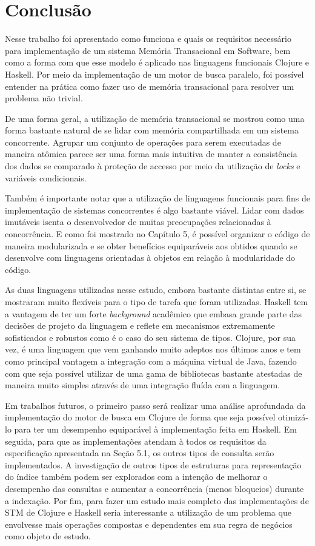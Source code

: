 \chapter{Conclusão}

Nesse trabalho foi apresentado como funciona e quais os requisitos necessário para implementação de um sistema Memória Transacional em Software, bem como a forma com que esse modelo é aplicado nas linguagens funcionais Clojure e Haskell. Por meio da implementação de um motor de busca paralelo, foi possível entender na prática como fazer uso de memória transacional para resolver um problema não trivial.

De uma forma geral, a utilização de memória transacional se mostrou como uma forma bastante natural de se lidar com memória compartilhada em um sistema concorrente. Agrupar um conjunto de operações para serem executadas de maneira atômica parece ser uma forma mais intuitiva de manter a consistência dos dados se comparado à proteção de accesso por meio da utilização de \emph{locks} e variáveis condicionais.

Também é importante notar que a utilização de linguagens funcionais para fins de implementação de sistemas concorrentes é algo bastante viável. Lidar com dados imutáveis isenta o desenvolvedor de muitas preocupações relacionadas à concorrência. E como foi mostrado no Capítulo 5, é possível organizar o código de maneira modularizada e se obter benefícios equiparáveis aos obtidos quando se desenvolve com linguagens orientadas à objetos em relação à modularidade do código.

As duas linguagens utilizadas nesse estudo, embora bastante distintas entre si, se mostraram muito flexíveis para o tipo de tarefa que foram utilizadas. Haskell tem a vantagem de ter um forte \emph{background} acadêmico que embasa grande parte das decisões de projeto da linguagem e reflete em mecanismos extremamente sofisticados e robustos como é o caso do seu sistema de tipos. Clojure, por sua vez, é uma linguagem que vem ganhando muito adeptos nos últimos anos e tem como principal vantagem a integração com a máquina virtual de Java, fazendo com que seja possível utilizar de uma gama de bibliotecas bastante atestadas de maneira muito simples através de uma integração fluída com a linguagem.

Em trabalhos futuros, o primeiro passo será realizar uma análise aprofundada da implementação do motor de busca em Clojure de forma que seja possível otimizá-lo para ter um desempenho equiparável à implementação feita em Haskell. Em seguida, para que as implementações atendam à todos os requisitos da especificação apresentada na Seção 5.1, os outros tipos de consulta serão implementados. A investigação de outros tipos de estruturas para representação do índice também podem ser explorados com a intenção de melhorar o desempenho das consultas e aumentar a concorrência (menos bloqueios) durante a indexação. Por fim, para fazer um estudo mais completo das implementações de STM de Clojure e Haskell seria interessante a utilização de um problema que envolvesse mais operações compostas e dependentes em sua regra de negócios como objeto de estudo.